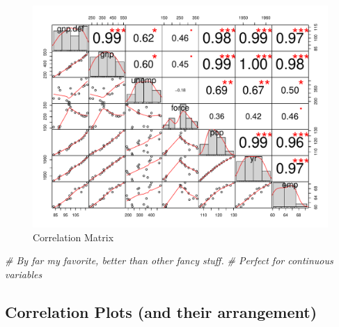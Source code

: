 \documentclass[11pt,]{article}
\newenvironment{Shaded}{\begin{snugshade}}{\end{snugshade}}
\newcommand{\KeywordTok}[1]{\textcolor[rgb]{0.13,0.29,0.53}{\textbf{#1}}}
\newcommand{\DataTypeTok}[1]{\textcolor[rgb]{0.13,0.29,0.53}{#1}}
\newcommand{\DecValTok}[1]{\textcolor[rgb]{0.00,0.00,0.81}{#1}}
\newcommand{\StringTok}[1]{\textcolor[rgb]{0.31,0.60,0.02}{#1}}
\newcommand{\CommentTok}[1]{\textcolor[rgb]{0.56,0.35,0.01}{\textit{#1}}}
\newcommand{\OperatorTok}[1]{\textcolor[rgb]{0.81,0.36,0.00}{\textbf{#1}}}
\newcommand{\NormalTok}[1]{#1}
\begin{document}
\begin{figure}[h!]

{\centering \includegraphics[width=0.5\linewidth]{figures/cormat-1} 

}

\caption{\label{fig:corrmat}Correlation Matrix}\label{fig:cormat}
\end{figure}

\begin{Shaded}
\begin{Highlighting}[]
  \CommentTok{# By far my favorite, better than other fancy stuff.}
  \CommentTok{# Perfect for continuous variables}
\end{Highlighting}
\end{Shaded}

\normalsize

\subsection{Correlation Plots (and their
arrangement)}\label{correlation-plots-and-their-arrangement}

\tiny

\begin{Shaded}
\end{Shaded}
\end{document}

